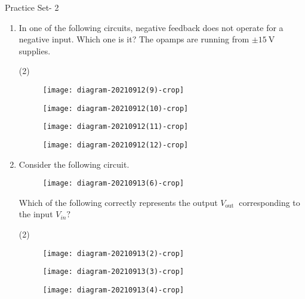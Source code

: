  \newpage
 \begin{abox}
 	Practice Set- 2
 \end{abox}
 \begin{enumerate}
 	\item In one of the following circuits, negative feedback does not operate for a negative input. Which one is it? The opamps are running from $\pm 15 \mathrm{~V}$ supplies.
 	{}
 	\begin{tasks}(2)
 		\task[\textbf{A.}] \begin{figure}[H]
 			\centering
 			\texttt{[image: diagram-20210912(9)-crop]}
 		\end{figure}
 		\task[\textbf{B.}] \begin{figure}[H]
 			\centering
 			\texttt{[image: diagram-20210912(10)-crop]}
 		\end{figure}
 		\task[\textbf{C.}] \begin{figure}[H]
 			\centering
 			\texttt{[image: diagram-20210912(11)-crop]}
 		\end{figure}
 		\task[\textbf{D.}] \begin{figure}[H]
 			\centering
 			\texttt{[image: diagram-20210912(12)-crop]}
 		\end{figure}
 	\end{tasks}
 	\item Consider the following circuit.\\
 	\begin{figure}[H]
 		\centering
 		\texttt{[image: diagram-20210913(6)-crop]}
 	\end{figure}
 	Which of the following correctly represents the output $V_{\text {out }}$ corresponding to the input $V_{i n} ?$
 	{}
 	\begin{tasks}(2)
 		\task[\textbf{A.}] \begin{figure}[H]
 			\centering
 			\texttt{[image: diagram-20210913(2)-crop]}
 		\end{figure}
 		\task[\textbf{B.}] \begin{figure}[H]
 			\centering
 			\texttt{[image: diagram-20210913(3)-crop]}
 		\end{figure}
 		\task[\textbf{C.}]\begin{figure}[H]
 			\centering
 			\texttt{[image: diagram-20210913(4)-crop]}
 		\end{figure}

\end{tasks}
\end{enumerate}
